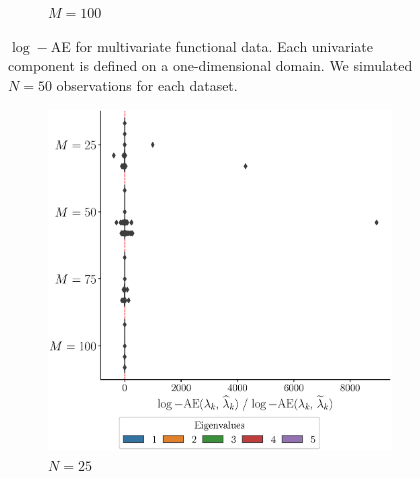 \begin{results}
\begin{figure}
\begin{subfigure}[b]{0.49\textwidth}
         \caption{$M = 100$}
         \label{fig:logAE_mfd_1d_100}
    \end{subfigure}
    \caption{$\log-$AE for multivariate functional data. Each univariate component is defined on a one-dimensional domain. We simulated $N = 50$ observations for each dataset.}
    \label{fig:logAE_mfd_1d}
\end{figure}

\begin{figure}
     \centering
     \begin{subfigure}[b]{0.49\textwidth}
         \centering
         \includegraphics[width=\textwidth]{figures/scenario_2/logAE_N25.eps}
         \caption{$N = 25$}
         \label{fig:logAE_mfd_2d_25}
     \end{subfigure}
     \hfill
     \begin{subfigure}[b]{0.49\textwidth}
         \centering

\end{subfigure}
\end{figure}
\end{results}
